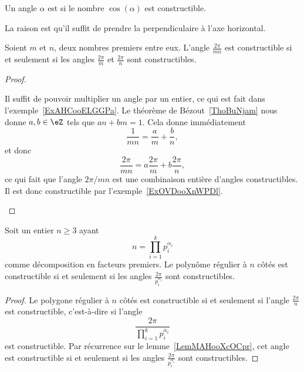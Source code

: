 \begin{definition}
	Un angle \( \alpha\) est  si le nombre \( \cos(\alpha)\) est constructible.
\end{definition}
La raison est qu'il suffit de prendre la perpendiculaire à l'axe horizontal.

\begin{lemma}   \label{LemMAHooXcOCpr}
	Soient \( m\) et \( n\), deux nombres premiers entre eux. L'angle \( \frac{ 2\pi }{ mn }\) est constructible si et seulement si les angles \( \frac{ 2\pi }{ m }\) et \( \frac{ 2\pi }{ n }\) sont constructibles.
\end{lemma}

\begin{proof}
	\begin{subproof}
		Il suffit de pouvoir multiplier un angle par un entier, ce qui est fait dans l'exemple~\ref{ExAHCooELGGPa}.
		Le théorème de Bézout~\ref{ThoBuNjam} nous donne \( a,b\in \eZ\) tels que \( an+bm=1\). Cela donne immédiatement
		\begin{equation}
			\frac{1}{ mn }=\frac{ a }{ m }+\frac{ b }{ n },
		\end{equation}
		et donc
		\begin{equation}
			\frac{ 2\pi }{ mn }=a\frac{ 2\pi }{ m }+b\frac{ 2\pi }{ n },
		\end{equation}
		ce qui fait que l'angle \( 2\pi/mn\) est une combinaison entière d'angles constructibles. Il est donc constructible par l'exemple~\ref{ExOVDooXnWPDl}.
	\end{subproof}
\end{proof}

\begin{lemma}   \label{LemUKNooSBzDyY}
	Soit un entier \( n\geq 3\) ayant
	\begin{equation}
		n=\prod_{i=1}^kp_i^{\alpha_i}
	\end{equation}
	comme décomposition en facteurs premiers. Le polynôme régulier à \( n\) côtés est constructible si et seulement si les angles \( \frac{ 2\pi }{ p_i^{\alpha_i} }\) sont constructibles.
\end{lemma}

\begin{proof}
	Le polygone régulier à \( n\) côtés est constructible si et seulement si l'angle \( \frac{ 2\pi }{ n }\) est constructible, c'est-à-dire si l'angle
	\begin{equation}
		\frac{ 2\pi }{ \prod_{i=1}^kp_i^{\alpha_i} }
	\end{equation}
	est constructible. Par récurrence sur le lemme~\ref{LemMAHooXcOCpr}, cet angle est constructible si et seulement si les angles \( \frac{ 2\pi }{ p_i^{\alpha_i} }\) sont constructibles.
\end{proof}

